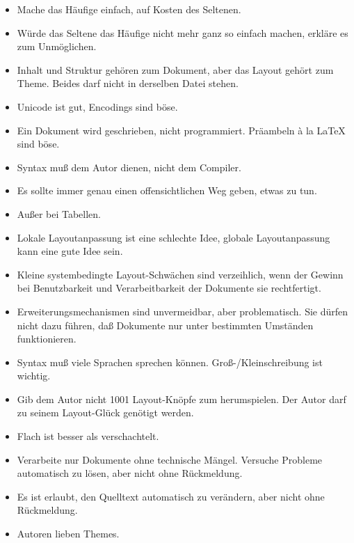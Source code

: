 \documentclass[12pt,openany]{book}
\begin{document}
\begin{itemize}
\item Mache das Häufige einfach, auf Kosten des Seltenen.

\item Würde das Seltene das Häufige nicht mehr ganz so einfach machen, erkläre
  es zum Unmöglichen.

\item Inhalt und Struktur gehören zum Dokument, aber das Layout gehört zum
  Theme.  Beides darf nicht in derselben Datei stehen.

\item Unicode ist gut, Encodings sind böse.

\item Ein Dokument wird geschrieben, nicht programmiert.  Präambeln à la LaTeX
  sind böse.

\item Syntax muß dem Autor dienen, nicht dem Compiler.

\item Es sollte immer genau einen offensichtlichen Weg geben, etwas zu tun.

\item Außer bei Tabellen.

\item Lokale Layoutanpassung ist eine schlechte Idee, globale Layoutanpassung
  kann eine gute Idee sein.

\item Kleine systembedingte Layout-Schwächen sind verzeihlich, wenn der Gewinn
  bei Benutzbarkeit und Verarbeitbarkeit der Dokumente sie rechtfertigt.

\item Erweiterungsmechanismen sind unvermeidbar, aber problematisch.  Sie
  dürfen nicht dazu führen, daß Dokumente nur unter bestimmten Umständen
  funktionieren.

\item Syntax muß viele Sprachen sprechen können.  Groß-/Kleinschreibung ist
  wichtig.

\item Gib dem Autor nicht 1001 Layout-Knöpfe zum herumspielen.  Der Autor darf
  zu seinem Layout-Glück genötigt werden.

\item Flach ist besser als verschachtelt.

\item Verarbeite nur Dokumente ohne technische Mängel.  Versuche Probleme
  automatisch zu lösen, aber nicht ohne Rückmeldung.

\item Es ist erlaubt, den Quelltext automatisch zu verändern, aber nicht ohne
  Rückmeldung.

\item Autoren lieben Themes.
\end{itemize}
\end{document}
